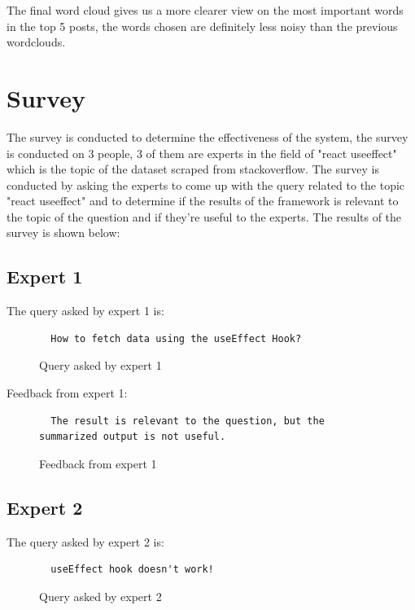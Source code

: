 \noindent The final word cloud gives us a more clearer view on the most important words in the top 5 posts, the words chosen are definitely less noisy than the previous wordclouds.

\section{Survey} \label{survey_results}
The survey is conducted to determine the effectiveness of the system, the survey is conducted on 3 people, 3 of them are experts in the field of "react useeffect" which is the topic of the dataset scraped from stackoverflow. The survey is conducted by asking the experts to come up with the query related to the topic "react useeffect" and to determine if the results of the framework is relevant to the topic of the question and if they're useful to the experts. The results of the survey is shown below:

\subsection{Expert 1} \label{survey_expert_1}
The query asked by expert 1 is:

\begin{figure}[H]
\noindent\begin{lstlisting}
  How to fetch data using the useEffect Hook?
\end{lstlisting}
\caption{Query asked by expert 1}
\label{fig:query-asked-by-expert-1}
\end{figure}

Feedback from expert 1:

\begin{figure}[H]
\noindent\begin{lstlisting}
  The result is relevant to the question, but the summarized output is not useful.
\end{lstlisting}
\caption{Feedback from expert 1}
\label{fig:feedback-from-expert-1}
\end{figure}

\subsection{Expert 2} \label{survey_expert_2}
The query asked by expert 2 is:
\begin{figure}[H]
\noindent\begin{lstlisting}
  useEffect hook doesn't work!
\end{lstlisting}
\caption{Query asked by expert 2}
\label{fig:query-asked-by-expert-2}
\end{figure}

